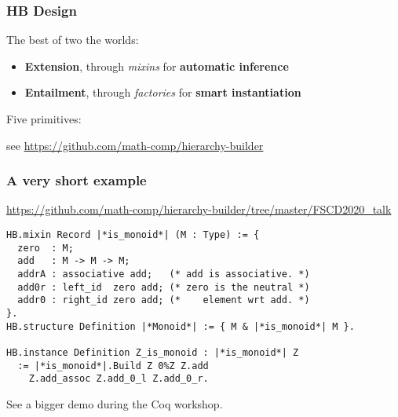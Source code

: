 \documentclass[11pt]{beamer}
\let\L=\lstinline
\begin{document}
\begin{frame}
  \frametitle{HB Design}

  The best of two the worlds:
  \begin{itemize}
  \item \textbf{Extension}, through \emph{mixins} for \textbf{automatic inference}

  \item \textbf{Entailment}, through \emph{factories} for
    \textbf{smart instantiation}

  \end{itemize}
  \vspace{2em}
  \pause
  \vfill

  Five primitives:
  \vfill

  \pause
  \begin{center}
    see \url{https://github.com/math-comp/hierarchy-builder}
  \end{center}

\end{frame}

\begin{frame}[fragile]
  \frametitle{A very short example}
{\scriptsize\url{https://github.com/math-comp/hierarchy-builder/tree/master/FSCD2020_talk}}

\begin{lstlisting}
HB.mixin Record |*is_monoid*| (M : Type) := {
  zero  : M;
  add   : M -> M -> M;
  addrA : associative add;   (* add is associative. *)
  add0r : left_id  zero add; (* zero is the neutral *)
  addr0 : right_id zero add; (*    element wrt add. *)
}.
HB.structure Definition |*Monoid*| := { M & |*is_monoid*| M }.

HB.instance Definition Z_is_monoid : |*is_monoid*| Z
  := |*is_monoid*|.Build Z 0%Z Z.add
    Z.add_assoc Z.add_0_l Z.add_0_r.
\end{lstlisting}
  \vfill

  See a bigger demo during the Coq workshop.
\end{frame}
\end{document}
